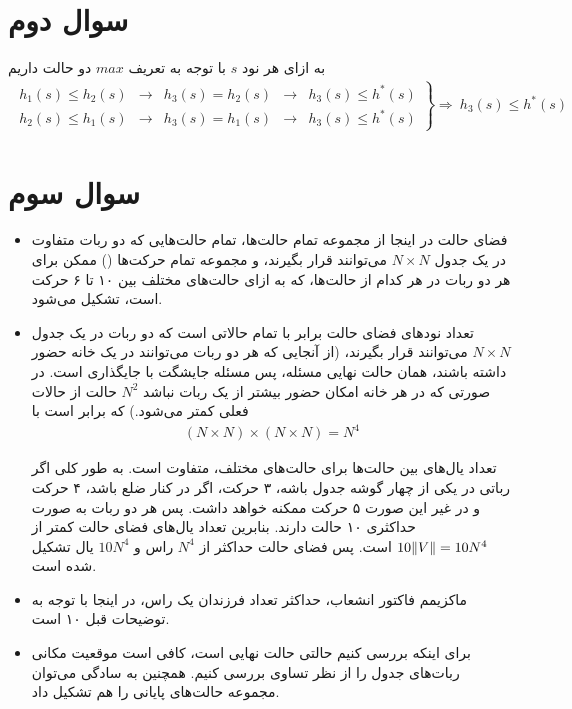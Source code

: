 \documentclass{article}
\DeclarePairedDelimiter\norm{\lVert}{\rVert}
\begin{document}
\section*{سوال دوم}
به ازای هر نود $s$ با توجه به تعریف $max$ دو حالت داریم
\begin{align*}
\left.\begin{array}{lclcl}
	h_1(s) \leq h_2(s) & \rightarrow & h_3(s) = h_2(s) & \rightarrow & h_3(s) \leq h^*(s) \\[1ex]
	h_2(s) \le h_1(s) & \rightarrow & h_3(s) = h_1(s) & \rightarrow &  h_3(s) \leq h^*(s)
\end{array}\right\} \Rightarrow\ h_3(s) \leq h^*(s)
\end{align*}

\newpage
\section*{سوال سوم}
\begin{itemize}
\item
فضای حالت در اینجا از مجموعه تمام حالت‌ها، تمام حالت‌هایی که دو ربات متفاوت در یک جدول $N \times N$ می‌توانند قرار بگیرند، و مجموعه تمام حرکت‌ها () ممکن برای هر دو ربات در هر کدام از حالت‌ها، که به ازای حالت‌های مختلف بین ۱۰ تا ۶ حرکت است، تشکیل می‌شود.

\item
تعداد نود‌های فضای حالت برابر با تمام حالاتی است که دو ربات در یک جدول $N \times N$ می‌توانند قرار بگیرند، (از آنجایی که هر دو ربات می‌توانند در یک خانه حضور داشته باشند، همان حالت نهایی مسئله، پس مسئله جایشگت با جایگذاری است. در صورتی که در هر خانه امکان حضور بیشتر از یک ربات نباشد $N^2$ حالت از حالات فعلی کمتر می‌شود.) که برابر است با 
\begin{align*}
	(N \times N) \times (N \times N) = N^4
\end{align*}

تعداد یال‌های بین حالت‌ها برای حالت‌های مختلف، متفاوت است. به طور کلی اگر رباتی در یکی از چهار گوشه جدول باشه، ۳ حرکت، اگر در کنار ضلع باشد، ۴ حرکت و در غیر این صورت ۵ حرکت ممکنه خواهد داشت. پس هر دو ربات به صورت حداکثری ۱۰ حالت دارند. بنابرین تعداد یال‌های فضای حالت کمتر از 
$10 \norm{V} = 10 N^4$
است. پس فضای حالت حداکثر از $N^4$  راس و $10N^4$ یال تشکیل شده است.
 
\item 
ماکزیمم فاکتور انشعاب، حداکثر تعداد فرزندان یک راس، در اینجا با توجه به توضیحات قبل ۱۰ است.

\item
برای اینکه بررسی کنیم حالتی حالت نهایی است، کافی است موقعیت مکانی‌ ربات‌های جدول را از نظر تساوی بررسی کنیم.
همچنین به سادگی می‌توان مجموعه حالت‌های پایانی را هم تشکیل داد.
\end{itemize}
\end{document}
